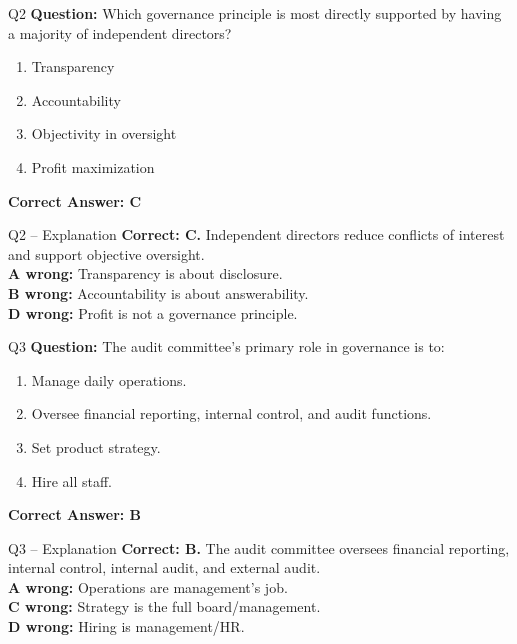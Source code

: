 \documentclass[aspectratio=169,10pt]{beamer}
\begin{document}
	\begin{frame}[t]{Q2}
		\small
		\textbf{Question:} Which governance principle is most directly supported by having a majority of independent directors?
		\begin{enumerate}[label=\Alph*.,itemsep=1pt,topsep=2pt]
			\item Transparency
			\item Accountability
			\item Objectivity in oversight
			\item Profit maximization
		\end{enumerate}
		\vspace{4pt}
		\textbf{Correct Answer: C}
	\end{frame}
	
	\begin{frame}[t]{Q2 -- Explanation}
		\small
		\textbf{Correct: C.} Independent directors reduce conflicts of interest and support objective oversight. \\[4pt]
		\textbf{A wrong:} Transparency is about disclosure. \\[2pt]
		\textbf{B wrong:} Accountability is about answerability. \\[2pt]
		\textbf{D wrong:} Profit is not a governance principle.
	\end{frame}
	
	\begin{frame}[t]{Q3}
		\small
		\textbf{Question:} The audit committee's primary role in governance is to:
		\begin{enumerate}[label=\Alph*.,itemsep=1pt,topsep=2pt]
			\item Manage daily operations.
			\item Oversee financial reporting, internal control, and audit functions.
			\item Set product strategy.
			\item Hire all staff.
		\end{enumerate}
		\vspace{4pt}
		\textbf{Correct Answer: B}
	\end{frame}
	
	\begin{frame}[t]{Q3 -- Explanation}
		\small
		\textbf{Correct: B.} The audit committee oversees financial reporting, internal control, internal audit, and external audit. \\[4pt]
		\textbf{A wrong:} Operations are management's job. \\[2pt]
		\textbf{C wrong:} Strategy is the full board/management. \\[2pt]
		\textbf{D wrong:} Hiring is management/HR.
	\end{frame}
	
\end{document}
